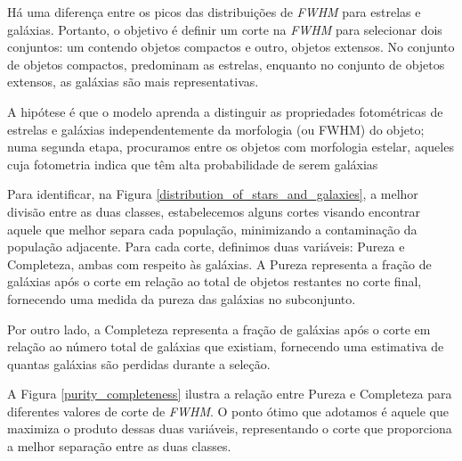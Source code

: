 \vspace{\baselineskip}

Há uma diferença entre os picos das distribuições de \textit{FWHM} para estrelas e galáxias. Portanto, o objetivo é definir um corte na \textit{FWHM} para selecionar dois conjuntos: um contendo objetos compactos e outro, objetos extensos. No conjunto de objetos compactos, predominam as estrelas, enquanto no conjunto de objetos extensos, as galáxias são mais representativas.

\vspace{\baselineskip}

A hipótese é que o modelo aprenda a distinguir as propriedades fotométricas de estrelas e galáxias independentemente da morfologia (ou FWHM) do objeto; numa segunda etapa, procuramos entre os objetos com morfologia estelar, aqueles cuja fotometria indica que têm alta probabilidade de serem galáxias


\vspace{\baselineskip}

Para identificar, na Figura \ref{distribution_of_stars_and_galaxies}, a melhor divisão entre as duas classes, estabelecemos alguns cortes visando encontrar aquele que melhor separa cada população, minimizando a contaminação da população adjacente. Para cada corte, definimos duas variáveis: Pureza e Completeza, ambas com respeito às galáxias. A Pureza representa a fração de galáxias após o corte em relação ao total de objetos restantes no corte final, fornecendo uma medida da pureza das galáxias no subconjunto.

Por outro lado, a Completeza representa a fração de galáxias após o corte em relação ao número total de galáxias que existiam, fornecendo uma estimativa de quantas galáxias são perdidas durante a seleção.

A Figura \ref{purity_completeness} ilustra a relação entre Pureza e Completeza para diferentes valores de corte de \textit{FWHM}. O ponto ótimo que adotamos é aquele que maximiza o produto dessas duas variáveis, representando o corte que proporciona a melhor separação entre as duas classes.

